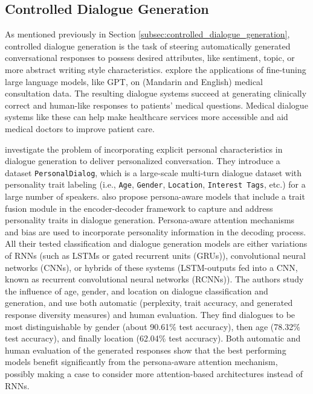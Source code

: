 \subsection{Controlled Dialogue Generation}
As mentioned previously in Section \ref{subsec:controlled_dialogue_generation}, controlled dialogue generation is the task of steering automatically generated conversational responses to possess desired attributes, like sentiment, topic, or more abstract writing style characteristics.
\cite{zeng-etal-2020-meddialog} explore the applications of fine-tuning large language models, like GPT, on (Mandarin and English) medical consultation data. The resulting dialogue systems succeed at generating clinically correct and human-like responses to patients' medical questions. Medical dialogue systems like these can help make healthcare services more accessible and aid medical doctors to improve patient care.

\cite{zheng2019personalized} investigate the problem of incorporating explicit personal characteristics in dialogue generation to deliver personalized conversation. They introduce a dataset \texttt{PersonalDialog}, which is a large-scale multi-turn dialogue dataset with personality trait labeling (i.e., \texttt{Age}, \texttt{Gender}, \texttt{Location}, \texttt{Interest Tags}, etc.) for a large number of speakers. \cite{zheng2019personalized} also propose persona-aware models that include a trait fusion module in the encoder-decoder framework to capture and address personality traits in dialogue generation. Persona-aware attention mechanisms and bias are used to incorporate personality information in the decoding process. All their tested classification and dialogue generation models are either variations of RNNs (such as LSTMs or gated recurrent units (GRUs)), convolutional neural networks (CNNs), or hybrids of these systems (LSTM-outputs fed into a CNN, known as recurrent convolutional neural networks (RCNNs)). The authors study the influence of age, gender, and location on dialogue classification and generation, and use both automatic (perplexity, trait accuracy, and generated response diversity measures) and human evaluation. They find dialogues to be most distinguishable by gender (about 90.61\% test accuracy), then age (78.32\% test accuracy), and finally location (62.04\% test accuracy). Both automatic and human evaluation of the generated responses show that the best performing models benefit significantly from the persona-aware attention mechanism, possibly making a case to consider more attention-based architectures instead of RNNs.

